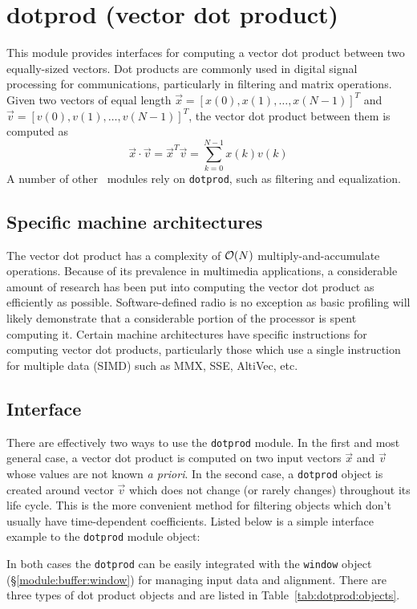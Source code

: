 % 
%

\newpage
\section{dotprod (vector dot product)}
\label{module:dotprod}

This module provides interfaces for computing a vector dot product
between two equally-sized vectors.
Dot products are commonly used in digital signal processing for
communications, particularly in filtering and matrix operations.
%
Given two vectors of equal length
$\vec{x} = \left[x(0),x(1),\ldots,x(N-1)\right]^T$ and
$\vec{v} = \left[v(0),v(1),\ldots,v(N-1)\right]^T$,
the vector dot product between them is computed as
%
\begin{equation}
    \vec{x} \cdot \vec{v}   =
    \vec{x}^T \vec{v}       =
    \sum_{k=0}^{N-1}{ x(k) v(k) }
\end{equation}
%
A number of other \liquid\ modules rely on {\tt dotprod},
such as filtering and equalization.

\subsection{Specific machine architectures}
\label{module:dotprod:arch}
The vector dot product has a complexity of $\mathcal{O}(N)$ multiply-and-accumulate
operations.
Because of its prevalence in multimedia applications, a considerable amount of
research has been put into computing the vector dot product as efficiently as
possible.
Software-defined radio is no exception as basic profiling will likely
demonstrate that a considerable portion of the processor is spent computing
it.
Certain machine architectures have specific instructions for computing vector
dot products, particularly those which use a single instruction for
multiple data (SIMD) such as MMX, SSE, AltiVec, etc.

\subsection{Interface}
\label{module:dotprod:usage}
There are effectively two ways to use the {\tt dotprod} module.
In the first and most general case, a vector dot product is computed on two
input vectors $\vec{x}$ and $\vec{v}$ whose values are not known
{\it a priori}.
%
In the second case, a {\tt dotprod} object is created around vector $\vec{v}$
which does not change (or rarely changes) throughout its life cycle.
This is the more convenient method for filtering objects which don't usually
have time-dependent coefficients.
Listed below is a simple interface example to the {\tt dotprod} module
object:
%

%
In both cases the {\tt dotprod} can be easily integrated with the
{\tt window} object (\S\ref{module:buffer:window})
for managing input data and alignment.
There are three types of dot product objects and are listed in
Table~\ref{tab:dotprod:objects}.

